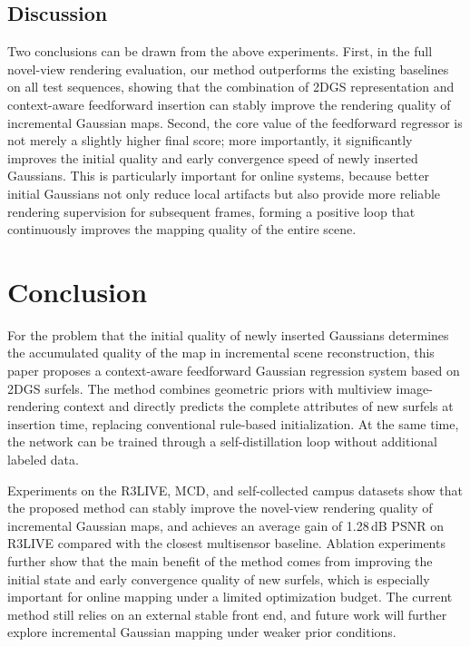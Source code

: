 \documentclass[lettersize,journal]{IEEEtran}
\begin{document}
\subsection{Discussion}

Two conclusions can be drawn from the above experiments. First, in the full novel-view rendering evaluation, our method outperforms the existing baselines on all test sequences, showing that the combination of 2DGS representation and context-aware feedforward insertion can stably improve the rendering quality of incremental Gaussian maps. Second, the core value of the feedforward regressor is not merely a slightly higher final score; more importantly, it significantly improves the initial quality and early convergence speed of newly inserted Gaussians. This is particularly important for online systems, because better initial Gaussians not only reduce local artifacts but also provide more reliable rendering supervision for subsequent frames, forming a positive loop that continuously improves the mapping quality of the entire scene.

\section{Conclusion}

For the problem that the initial quality of newly inserted Gaussians determines the accumulated quality of the map in incremental scene reconstruction, this paper proposes a context-aware feedforward Gaussian regression system based on 2DGS surfels. The method combines geometric priors with multiview image-rendering context and directly predicts the complete attributes of new surfels at insertion time, replacing conventional rule-based initialization. At the same time, the network can be trained through a self-distillation loop without additional labeled data.

Experiments on the R3LIVE, MCD, and self-collected campus datasets show that the proposed method can stably improve the novel-view rendering quality of incremental Gaussian maps, and achieves an average gain of 1.28\,dB PSNR on R3LIVE compared with the closest multisensor baseline. Ablation experiments further show that the main benefit of the method comes from improving the initial state and early convergence quality of new surfels, which is especially important for online mapping under a limited optimization budget. The current method still relies on an external stable front end, and future work will further explore incremental Gaussian mapping under weaker prior conditions.
\end{document}
